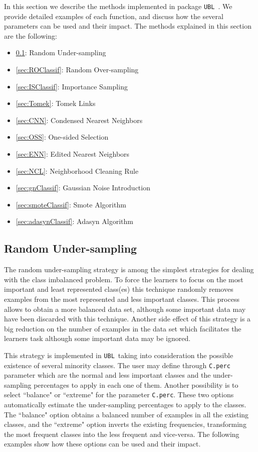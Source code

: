 \documentclass[10pt,a4paper]{article}\usepackage[]{graphicx}\usepackage[]{color}
\newcommand{\UBL}{\texttt{UBL}\ }
\newcommand{\pUBL}{package \texttt{UBL}\ }
\begin{document}
In this section we describe the methods implemented in \pUBL. We provide detailed examples of each function, and discuss how the several parameters can be used and their impact.
The methods explained in this section are the following:
\begin{itemize}
\item \ref{sec:RUClassif}: Random Under-sampling
\item \ref{sec:ROClassif}: Random Over-sampling
\item \ref{sec:ISClassif}: Importance Sampling
\item \ref{sec:Tomek}: Tomek Links
\item \ref{sec:CNN}: Condensed Nearest Neighbors
\item \ref{sec:OSS}: One-sided Selection
\item \ref{sec:ENN}: Edited Nearest Neighbors
\item \ref{sec:NCL}: Neighborhood Cleaning Rule
\item \ref{sec:gnClassif}: Gaussian Noise Introduction
\item \ref{sec:smoteClassif}: Smote Algorithm
\item \ref{sec:adasynClassif}: Adasyn Algorithm
\end{itemize}


\subsection{Random Under-sampling}\label{sec:RUClassif}

The random under-sampling strategy is among the simplest strategies for dealing with the class imbalanced problem. To force the learners to focus on the most important and least represented class(es) this technique randomly removes examples from the most represented and less important classes. This process allows to obtain a more balanced data set, although some important data may have been discarded with this technique. Another side effect of this strategy is a big reduction on the number of examples in the data set which facilitates the learners task although some important data may be ignored.

This strategy is implemented in \UBL taking into consideration the possible existence of several minority classes. The user may define through \texttt{C.perc} parameter which are the normal and less important classes and the under-sampling percentages to apply in each one of them. Another possibility is to select ``balance" or ``extreme" for the parameter \texttt{C.perc}. These two options automatically estimate the under-sampling percentages to apply to the classes. The ``balance" option obtains a balanced number of examples in all the existing classes, and the ``extreme" option inverts the existing frequencies, transforming the most frequent classes into the less frequent and vice-versa. The following examples show how these options can be used and their impact.
\end{document}
